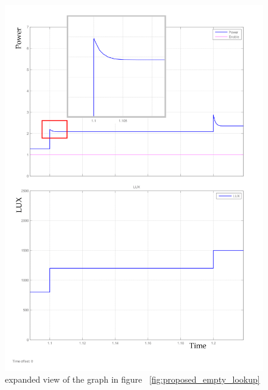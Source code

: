  \begin{figure}[H]
  \begin{center}
  \includegraphics[width=\textwidth]{images/proposed_step_input_zoom-1(2)_pip}
  \caption{ expanded view of the graph in figure ~\ref{fig:proposed_empty_lookup}}
  \label{fig:Zoom_proposed_empty_lookup}
  \end{center}
  \end{figure}

